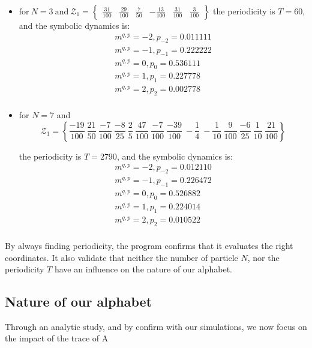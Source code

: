 \begin{itemize}

\item
$
\text{for} \: N = 3 \: \text{and} \: \mathcal{Z}_1 = \left\{ \begin{array}{cccccc} \frac{31}{100} & \frac{29}{100} & \frac{7}{50} & - \frac{13}{100} & \frac{31}{100} & \frac{3}{100} \end{array}\right\}
$
\vskip 0.1in
the periodicity is $T = 60$, and the symbolic dynamics is:
\[
\begin{array}{c}
m^{q,p} = -2, p_{-2} = 0.011111 \\
m^{q,p} = -1, p_{-1} = 0.222222 \\
m^{q,p} = 0, p_{0} = 0.536111 \\
m^{q,p} = 1, p_{1} = 0.227778 \\
m^{q,p} = 2, p_{2} = 0.002778\\
\end{array}
\]

\item
for $N = 7$ and
{ \small
\[
\mathcal{Z}_1 =
\left\{
\frac{-19}{100} ~ \frac{21}{50} ~
\frac{-7}{100} ~ \frac{-8}{25} ~ \frac{2}{5} ~ \frac{47}{100} ~
\frac{-7}{100} ~ \frac{-39}{100} ~ -\frac{1}{4} ~ -\frac{1}{10} ~
\frac{9}{100} ~ \frac{-6}{25} ~ \frac{1}{10} ~ \frac{21}{100}
\right\}
\]
} %


the periodicity is $T = 2790$, and the symbolic dynamics is:
\[
\begin{array}{c}
m^{q,p} = -2, p_{-2} = 0.012110 \\
m^{q,p} = -1, p_{-1} = 0.226472 \\
m ^{q,p} = 0, p_{0} = 0.526882 \\
m^{q,p} = 1, p_{1} = 0.224014 \\
m^{q,p} = 2, p_{2} = 0.010522 \\
\end{array}
\]

\end{itemize}
By always finding periodicity, the program confirms that it evaluates the
right coordinates. It also validate that neither the number of particle
$N$, nor the periodicity $T$ have an influence on the nature of our
alphabet.


\subsection{Nature of our alphabet}
\label{AKSalphabet}

Through an analytic study, and by confirm with our simulations, we now
focus on the impact of the trace of A

